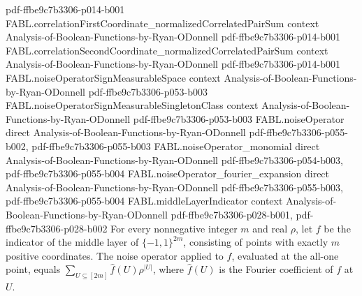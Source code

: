 \begin{theorem}
  {pdf-ffbe9c7b3306-p014-b001}
\proofstep
  {FABL.correlationFirstCoordinate_normalizedCorrelatedPairSum}
  {context}
  {Analysis-of-Boolean-Functions-by-Ryan-ODonnell}
  {pdf-ffbe9c7b3306-p014-b001}
\proofstep
  {FABL.correlationSecondCoordinate_normalizedCorrelatedPairSum}
  {context}
  {Analysis-of-Boolean-Functions-by-Ryan-ODonnell}
  {pdf-ffbe9c7b3306-p014-b001}
\proofstep
  {FABL.noiseOperatorSignMeasurableSpace}
  {context}
  {Analysis-of-Boolean-Functions-by-Ryan-ODonnell}
  {pdf-ffbe9c7b3306-p053-b003}
\proofstep
  {FABL.noiseOperatorSignMeasurableSingletonClass}
  {context}
  {Analysis-of-Boolean-Functions-by-Ryan-ODonnell}
  {pdf-ffbe9c7b3306-p053-b003}
\proofstep
  {FABL.noiseOperator}
  {direct}
  {Analysis-of-Boolean-Functions-by-Ryan-ODonnell}
  {pdf-ffbe9c7b3306-p055-b002,
    pdf-ffbe9c7b3306-p055-b003}
\proofstep
  {FABL.noiseOperator_monomial}
  {direct}
  {Analysis-of-Boolean-Functions-by-Ryan-ODonnell}
  {pdf-ffbe9c7b3306-p054-b003,
    pdf-ffbe9c7b3306-p055-b004}
\proofstep
  {FABL.noiseOperator_fourier_expansion}
  {direct}
  {Analysis-of-Boolean-Functions-by-Ryan-ODonnell}
  {pdf-ffbe9c7b3306-p055-b003,
    pdf-ffbe9c7b3306-p055-b004}
\proofstep
  {FABL.middleLayerIndicator}
  {context}
  {Analysis-of-Boolean-Functions-by-Ryan-ODonnell}
  {pdf-ffbe9c7b3306-p028-b001,
    pdf-ffbe9c7b3306-p028-b002}
For every nonnegative integer $m$ and real $\rho$, let $f$ be the indicator of the
middle layer of $\{−1,1\}^{2m}$, consisting of points with exactly $m$ positive
coordinates. The noise operator applied to $f$, evaluated at the all-one point, equals
$\displaystyle\sum_{U\subseteq[2m]}\widehat f(U)\rho^{|U|}$, where $\widehat f(U)$ is
the Fourier coefficient of $f$ at $U$.
\end{theorem}

